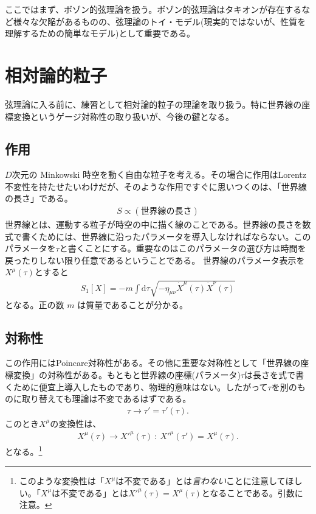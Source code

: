 \documentclass[report,paper=a4, fontsize=12pt, line_length=16cm, number_of_lines=33,dvipdfmx]{jlreq}
\numberwithin{equation}{chapter}
\numberwithin{equation}{section}
\newcommand{\di}{\mathrm{d}}
\begin{document}
ここではまず、ボゾン的弦理論を扱う。ボゾン的弦理論はタキオンが存在するなど様々な欠陥があるものの、弦理論のトイ・モデル(現実的ではないが、性質を理解するための簡単なモデル)として重要である。

\section{相対論的粒子}
弦理論に入る前に、練習として相対論的粒子の理論を取り扱う。特に世界線の座標変換というゲージ対称性の取り扱いが、今後の鍵となる。
\subsection{作用}
$D$次元の Minkowski 時空を動く自由な粒子を考える。その場合に作用はLorentz不変性を持たせたいわけだが、そのような作用ですぐに思いつくのは、「世界線の長さ」である。
\begin{align}
 S \propto (\text{世界線の長さ})
\end{align}
世界線とは、運動する粒子が時空の中に描く線のことである。世界線の長さを数式で書くためには、世界線に沿ったパラメータを導入しなければならない。このパラメータを$\tau$と書くことにする。重要なのはこのパラメータの選び方は時間を戻ったりしない限り任意であるということである。  世界線のパラメータ表示を$X^{\mu}(\tau)$とすると
\begin{align}
 S_{1}[X]=-m\int \di \tau \sqrt{-\eta_{\mu\nu}\dot{X}^{\mu}(\tau) \dot{X}^{\nu}(\tau)}
\label{particle-action1}
\end{align}
となる。正の数 $m$ は質量であることが分かる。
\subsection{対称性}
この作用にはPoincare対称性がある。その他に重要な対称性として「世界線の座標変換」の対称性がある。もともと世界線の座標(パラメータ)$\tau$は長さを式で書くために便宜上導入したものであり、物理的意味はない。したがって$\tau$を別のものに取り替えても理論は不変であるはずである。
\begin{align}
 \tau\to \tau'=\tau'(\tau).
\end{align}
このとき$X^{\mu}$の変換性は、
\begin{align}
 X^{\mu}(\tau)\to X'^{\mu}(\tau)\ :\ X'^{\mu}(\tau')=X^{\mu}(\tau).
\label{particle-reparam1}
\end{align}
となる。\footnote{このような変換性は「$X^{\mu}$は不変である」とは{\em 言わない}ことに注意してほしい。「$X^{\mu}$は不変である」とは$X'^{\mu}(\tau)=X^{\mu}(\tau)$となることである。引数に注意。}
\end{document}

